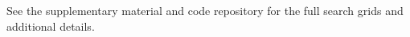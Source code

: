 
\noindent
See the supplementary material and code repository for the full search grids and additional details.

